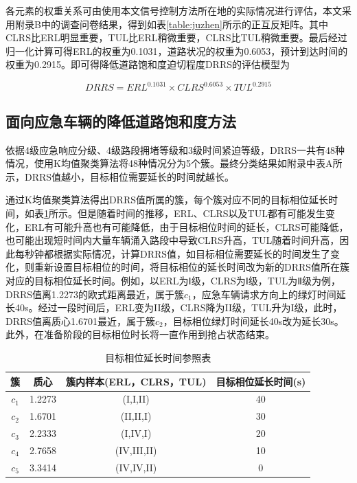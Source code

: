 各元素的权重关系可由使用本文信号控制方法所在地的实际情况进行评估，本文采用附录B中的调查问卷结果，得到如表\ref{table:juzhen}所示的正互反矩阵。其中CLRS比ERL明显重要，TUL比ERL稍微重要，CLRS比TUL稍微重要。最后经过归一化计算可得ERL的权重为0.1031，道路状况的权重为0.6053，预计到达时间的权重为0.2915。即可得降低道路饱和度迫切程度DRRS的评估模型为

\begin{equation}
	\label{equation:DRRS}
	DRRS={ERL}^{0.1031}\times{CLRS}^{0.6053}\times{TUL}^{0.2915} 
\end{equation}

\subsection{面向应急车辆的降低道路饱和度方法}

依据4级应急响应分级、4级路段拥堵等级和3级时间紧迫等级，DRRS一共有48种情况，使用K均值聚类算法将48种情况分为5个簇。最终分类结果如附录中表A所示，DRRS值越小，目标相位需要延长的时间就越长。



通过K均值聚类算法得出DRRS值所属的簇，每个簇对应不同的目标相位延长时间，如表\ref{table:extendtime}所示。但是随着时间的推移，ERL、CLRS以及TUL都有可能发生变化，ERL有可能升高也有可能降低，由于目标相位时间的延长，CLRS可能降低，也可能出现短时间内大量车辆涌入路段中导致CLRS升高，TUL随着时间升高，因此每秒钟都根据实际情况，计算DRRS值，如目标相位需要延长的时间发生了变化，则重新设置目标相位的时间，将目标相位的延长时间改为新的DRRS值所在簇对应的目标相位延长时间。例如，以ERL为Ⅰ级，CLRS为Ⅰ级，TUL为Ⅱ级为例，DRRS值离1.2273的欧式距离最近，属于簇${c_1}$，应急车辆请求方向上的绿灯时间延长40s。经过一段时间后，ERL变为II级，CLRS降为II级，TUL升为I级，此时，DRRS值离质心1.6701最近，属于簇${c_2}$，目标相位绿灯时间延长40s改为延长30s。此外，在准备阶段的目标相位时长将一直作用到抢占状态结束。

\begin{table}[H]
	\centering
	\caption{目标相位延长时间参照表}
	\label{table:extendtime}
	\begin{tabular}{|c|c|c|c|}
		\hline
		簇 & 质心 & 簇内样本(ERL，CLRS，TUL) &  目标相位延长时间(s) \\
		\hline
		${c_1}$ & 1.2273 & (I,I,II) & 40 \\ \hline
		${c_2}$ & 1.6701 & (II,II,I) & 30 \\ \hline
		${c_3}$ & 2.2333 & (I,IV,I) & 20 \\ \hline
		${c_4}$ & 2.7658 & (IV,III,II) & 10 \\ \hline
		${c_5}$ & 3.3414 & (IV,IV,II) & 0 \\ \hline
	\end{tabular}
\end{table}


